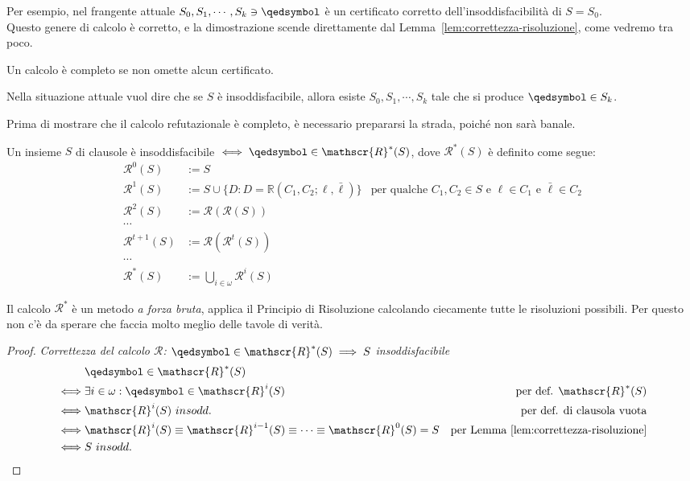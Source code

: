 Per esempio, nel frangente attuale $S_0, S_1, \cdots, S_k \ni \qedsymbol$ è un certificato corretto dell'insoddisfacibilità di $S = S_0$. \\
Questo genere di calcolo è corretto, e la dimostrazione scende direttamente dal Lemma~\ref{lem:correttezza-risoluzione}, come vedremo tra poco.

\begin{defi}[Completezza]
        Un calcolo è completo se non omette alcun certificato. 
\end{defi}
Nella situazione attuale vuol dire che se $S$ è insoddisfacibile, allora esiste $S_0, S_1, \cdots, S_k$ tale che si produce $\qedsymbol \in S_k$.

Prima di mostrare che il calcolo refutazionale è completo, è necessario 
prepararsi la strada, poiché non sarà banale. 

\begin{teo}
Un insieme $S$ di clausole è insoddisfacibile $\iff \qedsymbol \in \mathscr{R}^*(S)$, dove $\mathscr{R}^*(S)$ è definito come segue:
\begin{align*}
  \mathscr{R}^0(S) &:= S \\
  \mathscr{R}^1(S) &:= S \cup \{D: D = \mathbb{R}(C_1, C_2; \ell, \bar{\ell})\} & \text{per qualche } C_1,C_2 \in S \text{ e } \ell \in C_1 \text{ e } \bar\ell \in C_2 \\
  \mathscr{R}^2(S) &:= \mathscr{R}(\mathscr{R}(S)) \\
  \cdots \\
  \mathscr{R}^{t+1}(S) &:= \mathscr{R}(\mathscr{R}^{t}(S)) \\
  \cdots \\
  \mathscr{R}^*(S) &:= \bigcup\limits_{i \in \omega} \mathscr{R}^i(S)
\end{align*} 
\end{teo}

Il calcolo $\mathscr{R}^*$ è un metodo \textit{a forza bruta}, applica il Principio di Risoluzione calcolando ciecamente tutte le risoluzioni possibili. Per questo non c'è da sperare che faccia molto meglio delle tavole di verità. 

\begin{proof}
\textit{Correttezza del calcolo $\mathscr{R}$: $\qedsymbol \in \mathscr{R}^*(S) \implies S$ insoddisfacibile} \\
\begin{align*}
& \qedsymbol \in \mathscr{R}^*(S) \\
\iff & \exists i \in \omega : \qedsymbol \in \mathscr{R}^i(S) & \text{per def. } \mathscr{R}^*(S) \\
\iff & \mathscr{R}^i(S)\ insodd. & \text{per def. di clausola vuota} \\
\iff & \mathscr{R}^i(S) \equiv \mathscr{R}^{i-1}(S) \equiv \cdots \equiv \mathscr{R}^0(S) = S & \text{per Lemma~\ref{lem:correttezza-risoluzione}} \\
\iff & S\ insodd.
\end{align*}
\end{proof}

